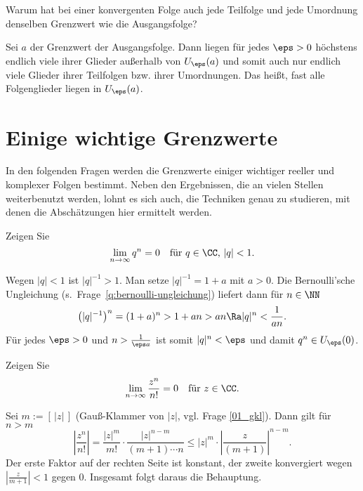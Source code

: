 \begin{frage}%
  Warum hat bei einer konvergenten Folge auch jede Teilfolge und 
  jede Umordnung denselben Grenzwert wie die Ausgangsfolge?
\end{frage}

\begin{antwort}
  Sei $a$ der Grenzwert der Ausgangsfolge. Dann liegen für jedes 
  $\eps >0$ höchs\-tens endlich viele ihrer Glieder außerhalb von 
  $U_\eps(a)$ und somit auch nur endlich viele Glieder ihrer 
  Teilfolgen bzw. ihrer Umordnungen. Das heißt, fast alle Folgenglieder 
  liegen in $U_\eps(a)$. 
  \AntEnd
\end{antwort}


\section{Einige wichtige Grenzwerte}

In den folgenden Fragen werden die Grenzwerte einiger wichtiger 
reeller und komplexer Folgen bestimmt. Neben den Ergebnissen, die an vielen 
Stellen weiterbenutzt werden, lohnt es sich auch, die Techniken genau zu studieren, 
mit denen die Abschätzungen hier ermittelt werden. 


\begin{frage}%
  \label{q:folge-geom-absch}
  Zeigen Sie
  \[
  \lim_{n\to\infty}q^n=0\quad\text{für $q\in\CC$,~$|q|<1$}.
  \]
\end{frage}

\begin{antwort}
  Wegen $|q|<1$ ist $|q|^{-1}>1$. 
  Man setze $|q|^{-1}=1+a$ mit $a>0$. Die 
  Bernoulli'sche Ungleichung (s.~Frage~\ref{q:bernoulli-ungleichung}) 
  liefert dann für $n\in \NN$ 
  \[
  \left( |q|^{-1} \right)^n =(1+a)^n>1+an>an \Ra |q|^n < \frac{1}{an}.
  \]
  Für jedes $\eps>0$ und $n>\frac{1}{\eps a}$ ist somit $|q|^n<\eps$ und 
  damit $q^n\in U_\eps(0)$.
  \AntEnd
\end{antwort}


\begin{frage}
  Zeigen Sie 
  \[
  \lim_{n\to\infty}\frac{z^n}{n!}=0\quad\text{für $z\in\CC$.}
  \]
\end{frage}

\begin{antwort}
  Sei $m:= [\, |z|\, ]$ 
  (Gauß-Klammer von $|z|$, vgl. Frage \ref{01_gkl}). Dann gilt 
  für $n>m$
  \[
  \left| \frac{z^n}{n!} \right| = \frac{ |z|^m }{ m! } \cdot 
  \frac{ |z|^{n-m} }{ (m+1)\cdots n } \le 
  |z|^m \cdot \left| \frac{z}{(m+1)} \right|^{n-m}.
  \]
  Der erste Faktor auf der rechten Seite ist konstant, der zweite konvergiert 
  wegen 
  $\left| \frac{z}{m+1} \right| < 1$ gegen $0$. 
  Insgesamt folgt daraus die Behauptung.
  \AntEnd
\end{antwort}

